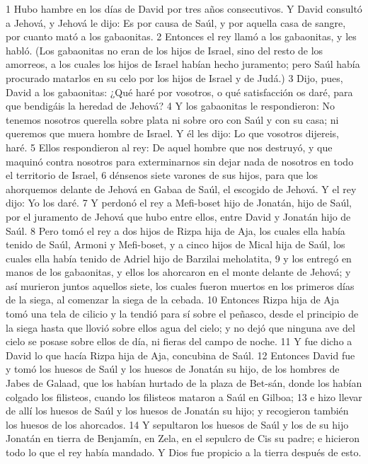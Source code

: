 1 Hubo hambre en los días de David por tres años consecutivos. Y David consultó a Jehová, y Jehová le dijo: Es por causa de Saúl, y por aquella casa de sangre, por cuanto mató a los gabaonitas.
2 Entonces el rey llamó a los gabaonitas, y les habló. (Los gabaonitas no eran de los hijos de Israel, sino del resto de los amorreos, a los cuales los hijos de Israel habían hecho juramento; pero Saúl había procurado matarlos en su celo por los hijos de Israel y de Judá.)
3 Dijo, pues, David a los gabaonitas: ¿Qué haré por vosotros, o qué satisfacción os daré, para que bendigáis la heredad de Jehová?
4 Y los gabaonitas le respondieron: No tenemos nosotros querella sobre plata ni sobre oro con Saúl y con su casa; ni queremos que muera hombre de Israel. Y él les dijo: Lo que vosotros dijereis, haré.
5 Ellos respondieron al rey: De aquel hombre que nos destruyó, y que maquinó contra nosotros para exterminarnos sin dejar nada de nosotros en todo el territorio de Israel,
6 dénsenos siete varones de sus hijos, para que los ahorquemos delante de Jehová en Gabaa de Saúl, el escogido de Jehová. Y el rey dijo: Yo los daré.
7 Y perdonó el rey a Mefi-boset hijo de Jonatán, hijo de Saúl, por el juramento de Jehová que hubo entre ellos, entre David y Jonatán hijo de Saúl. 
8 Pero tomó el rey a dos hijos de Rizpa hija de Aja, los cuales ella había tenido de Saúl, Armoni y Mefi-boset, y a cinco hijos de Mical hija de Saúl, los cuales ella había tenido de Adriel hijo de Barzilai meholatita, 
9 y los entregó en manos de los gabaonitas, y ellos los ahorcaron en el monte delante de Jehová; y así murieron juntos aquellos siete, los cuales fueron muertos en los primeros días de la siega, al comenzar la siega de la cebada.
10 Entonces Rizpa hija de Aja tomó una tela de cilicio y la tendió para sí sobre el peñasco, desde el principio de la siega hasta que llovió sobre ellos agua del cielo; y no dejó que ninguna ave del cielo se posase sobre ellos de día, ni fieras del campo de noche.
11 Y fue dicho a David lo que hacía Rizpa hija de Aja, concubina de Saúl.
12 Entonces David fue y tomó los huesos de Saúl y los huesos de Jonatán su hijo, de los hombres de Jabes de Galaad, que los habían hurtado de la plaza de Bet-sán, donde los habían colgado los filisteos, cuando los filisteos mataron a Saúl en Gilboa; 
13 e hizo llevar de allí los huesos de Saúl y los huesos de Jonatán su hijo; y recogieron también los huesos de los ahorcados.
14 Y sepultaron los huesos de Saúl y los de su hijo Jonatán en tierra de Benjamín, en Zela, en el sepulcro de Cis su padre; e hicieron todo lo que el rey había mandado. Y Dios fue propicio a la tierra después de esto.
